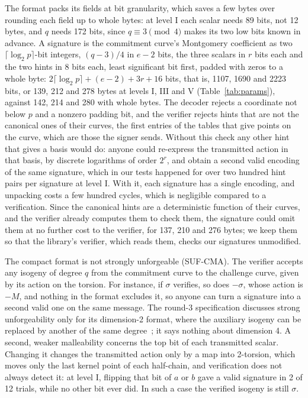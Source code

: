 \documentclass[version=preprint]{iacrcc}
\begin{document}
    The format packs its fields at bit granularity, which saves a few bytes
    over rounding each field up to whole bytes: at level I each scalar needs
    89 bits, not 12 bytes, and $q$ needs 172 bits, since $q \equiv 3 \pmod 4$
    makes its two low bits known in advance. A signature is the commitment
    curve's Montgomery coefficient as two $\lceil \log_2 p \rceil$-bit integers,
    $(q - 3)/4$ in $e - 2$ bits, the three scalars in $r$ bits each and the two
    hints in 8 bits each, least significant bit first, padded with zeros to a
    whole byte: $2 \lceil \log_2 p \rceil + (e - 2) + 3r + 16$ bits, that is,
    1107, 1690 and 2223 bits, or 139, 212 and 278 bytes at levels I, III and V
    (Table~\ref{tab:params}), against 142, 214 and 280 with whole bytes. The
    decoder rejects a coordinate not below $p$ and a nonzero padding bit, and
    the verifier rejects hints that are not the canonical ones of their
    curves, the first entries of the tables that give points on the curve,
    which are those the signer sends. Without this check any other hint that
    gives a basis would do: anyone could re-express the transmitted action in
    that basis, by discrete logarithms of order $2^r$, and obtain a second
    valid encoding of the same signature, which in our tests happened for
    over two hundred hint pairs per signature at level I. With it, each
    signature has a single encoding, and unpacking costs a few hundred
    cycles, which is negligible compared to a verification. Since the canonical hints are a deterministic function of their curves, and
    the verifier already computes them to check them, the signature could omit
    them at no further cost to the verifier, for 137, 210 and 276 bytes; we
    keep them so that the library's verifier, which reads them, checks our
    signatures unmodified.

    The compact format is not strongly unforgeable (SUF-CMA). The verifier accepts any isogeny of degree $q$ from
    the commitment curve to the challenge curve, given by its action on the
    torsion. For instance, if $\sigma$ verifies, so does $-\sigma$, whose
    action is $-M$, and nothing in the format excludes it, so anyone can turn a
    signature into a second valid one on the same message. The round-3
    specification discusses strong unforgeability only for its dimension-2
    format, where the auxiliary isogeny can be replaced by another of the same
    degree~\cite[Section 8.4.2]{AAA+26}; it says nothing about dimension 4.
    A second, weaker malleability concerns the top bit of each transmitted
    scalar. Changing it changes the transmitted action only by a map into
    2-torsion, which moves only the last kernel point of each half-chain, and
    verification does not always detect it: at level I, flipping that bit of
    $a$ or $b$ gave a valid signature in 2 of 12 trials, while no other bit ever
    did. In such a case the verified isogeny is still $\sigma$.
\end{document}
